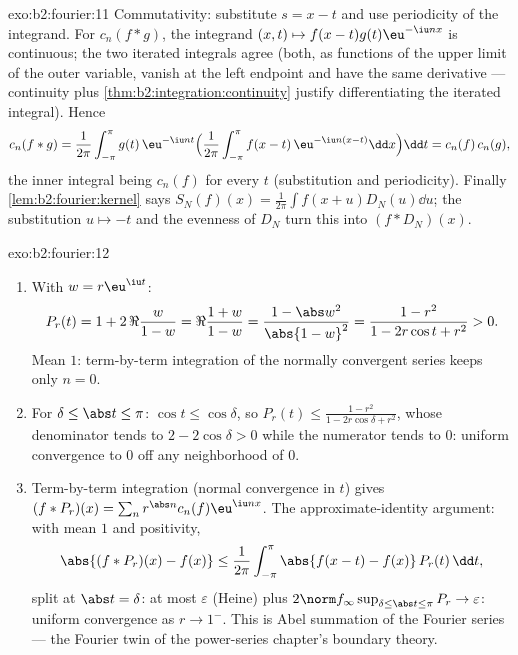 \begin{solution}{exo:b2:fourier:11}
Commutativity: substitute $s = x - t$ and use periodicity of
the integrand. For $c_n(f * g)$, the integrand $(x, t) \mapsto
f(x-t)g(t)\eu^{-\iu nx}$ is continuous; the two iterated
integrals agree (both, as functions of the upper limit of the
outer variable, vanish at the left endpoint and have the same
derivative --- continuity plus
\cref{thm:b2:integration:continuity} justify differentiating
the iterated integral). Hence
\[
c_n(f*g) = \frac{1}{2\pi}\int_{-\pi}^{\pi} g(t)\,\eu^{-\iu nt}
\Bigl(\frac{1}{2\pi}\int_{-\pi}^{\pi}
f(x-t)\,\eu^{-\iu n(x-t)}\dd x\Bigr)\dd t
= c_n(f)\,c_n(g),
\]
the inner integral being $c_n(f)$ for every $t$ (substitution
and periodicity). Finally \cref{lem:b2:fourier:kernel} says
$S_N(f)(x) = \frac{1}{2\pi}\int f(x+u)D_N(u)\dd u$; the
substitution $u \mapsto -t$ and the evenness of $D_N$ turn this
into $(f * D_N)(x)$.
\end{solution}

\begin{solution}{exo:b2:fourier:12}
\begin{enumerate}
  \item With $w = r\eu^{\iu t}$:
        \[
        P_r(t) = 1 + 2\,\Re\frac{w}{1 - w}
        = \Re\frac{1 + w}{1 - w}
        = \frac{1 - \abs w^2}{\abs{1 - w}^2}
        = \frac{1 - r^2}{1 - 2r\cos t + r^2} > 0 .
        \]
        Mean $1$: term-by-term integration of the normally
        convergent series keeps only $n = 0$.
  \item For $\delta \leq \abs t \leq \pi$: $\cos t \leq
        \cos\delta$, so $P_r(t) \leq \frac{1 - r^2}{1 -
        2r\cos\delta + r^2}$, whose denominator tends to $2 -
        2\cos\delta > 0$ while the numerator tends to $0$:
        uniform convergence to $0$ off any neighborhood of
        $0$.
  \item Term-by-term integration (normal convergence in $t$)
        gives $(f * P_r)(x) = \sum_n r^{\abs
        n}c_n(f)\eu^{\iu nx}$. The approximate-identity
        argument: with mean $1$ and positivity,
        \[
        \abs{(f*P_r)(x) - f(x)}
        \leq \frac{1}{2\pi}\int_{-\pi}^{\pi}
        \abs{f(x-t) - f(x)}\,P_r(t)\,\dd t ,
        \]
        split at $\abs t = \delta$: at most $\varepsilon$
        (Heine) plus $2\norm f_\infty\sup_{\delta\leq\abs
        t\leq\pi}P_r \to \varepsilon$: uniform convergence as
        $r \to 1^-$. This is Abel summation of the Fourier
        series --- the Fourier twin of the power-series
        chapter's boundary theory.
\end{enumerate}
\end{solution}

